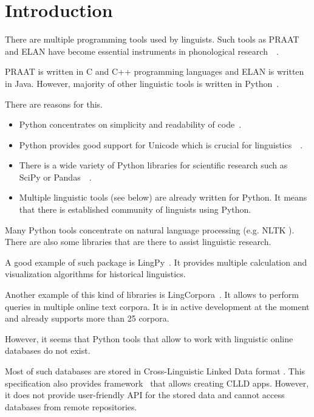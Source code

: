 \documentclass[a4paper,12pt]{article}
\begin{document}
\newpage
\section{Introduction}
There are multiple programming tools used by linguists. Such tools as PRAAT and ELAN have become essential instruments in phonological research~\parencite{praat}~\parencite{elan}.

PRAAT is written in C and C++ programming languages and ELAN is written in Java. However, majority of other linguistic tools is written in Python~\parencite{python}.

There are reasons for this.
\begin{itemize}
 \item Python concentrates on simplicity and readability of code~\parencite{zen}.
 \item Python provides good support for Unicode which is crucial for linguistics~\parencite{unicode}~\parencite{python}.
 \item There is a wide variety of Python libraries for scientific research such as SciPy or Pandas~\parencite{scipy}~\parencite{pandas}.
 \item Multiple linguistic tools (see below) are already written for Python. It means that there is established community of linguists using Python.
\end{itemize}

Many Python tools concentrate on natural language processing (e.g. NLTK \parencite{NLTK}). There are also some libraries that are there to assist linguistic research.

A good example of such package is LingPy~\parencite{List2017i}. It provides multiple calculation and visualization algorithms for historical linguistics.

Another example of this kind of libraries is LingCorpora~\parencite{alexey}. It allows to perform queries in multiple online text corpora. It is in active development at the moment and already supports more than 25 corpora.

However, it seems that Python tools that allow to work with linguistic online databases do not exist.

Most of such databases are stored in Cross-Linguistic Linked Data format \parencite{CLLD}. This specification also provides framework~\parencite{RobertForkel2019} that allows creating CLLD apps. However, it does not provide user-friendly API for the stored data and cannot access databases from remote repositories.
\end{document}
